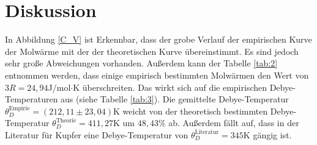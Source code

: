 \section{Diskussion}
In Abbildung \ref{C_V} ist Erkennbar,
dass der grobe Verlauf der empirischen Kurve der Molwärme
mit der der theoretischen Kurve übereinstimmt.
Es sind jedoch sehr große Abweichungen vorhanden.
Außerdem kann der Tabelle \ref{tab:2} entnommen werden,
dass einige empirisch bestimmten Molwärmen den Wert von $3R = 24,94$J/mol$\cdot$K überschreiten.
Das wirkt sich auf die empirischen Debye-Temperaturen aus (siehe Tabelle \ref{tab:3}).
Die gemittelte Debye-Temperatur $\theta_D^{\text{Empirie}} = (212,11\pm23,04)$K
weicht von der theoretisch bestimmten Debye-Temperatur $\theta_D^{\text{Theorie}} = 411,27$K
um $48,43\%$ ab.
Außerdem fällt auf, dass in der Literatur für Kupfer eine Debye-Temperatur von $\theta_D^{\text{Literatur}} = 345$K \cite{debye} gängig ist.
